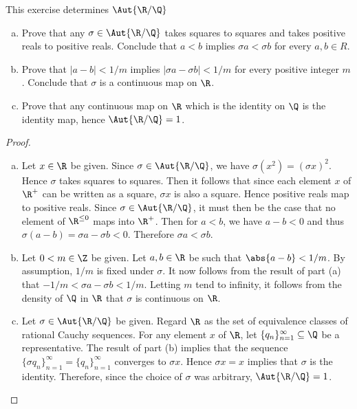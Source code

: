 \documentclass[10pt]{amsart}
\begin{document}
\begin{thm}
  \label{Ex3}
  This exercise determines $\Aut{\R/\Q}$
  \begin{enumerate}[(a)]
    \item
      Prove that any $\sigma \in \Aut{\R/\Q}$ takes squares to squares and takes positive reals to positive reals.
      Conclude that $a < b$ implies $\sigma a < \sigma b$ for every $a,b \in R$.
    \item
      Prove that $|a - b| < 1/m$ implies $|\sigma a - \sigma b|< 1/m$ for every positive integer $m$. 
      Conclude that $\sigma$ is a continuous map on $\R$.
    \item
      Prove that any continuous map on $\R$ which is the identity on $\Q$ is the identity map, hence $\Aut{\R/\Q} = 1$.
  \end{enumerate}

  \begin{proof}
    \begin{enumerate}[(a)]
    \item
      Let $x \in \R$ be given.
      Since $\sigma \in \Aut{\R/\Q}$, we have $\sigma(x^2) = (\sigma x)^2$.
      Hence $\sigma$ takes squares to squares.
      Then it follows that since each element $x$ of $\R^+$ can be written as a square, $\sigma x$ is also a square.
      Hence positive reals map to positive reals.
      Since $\sigma \in \Aut{\R/\Q}$, it must then be the case that no element of $\R^{\leq 0}$ maps into $\R^+$. 
      Then for $a < b$, we have $a - b < 0$ and thus $\sigma (a - b) = \sigma a - \sigma b < 0$.
      Therefore $\sigma a < \sigma b$.
    \item
      Let $0 < m \in \Z$ be given.
      Let $a,b \in \R$ be such that $\abs{a-b} < 1/m$.
      By assumption, $1/m$ is fixed under $\sigma$.
      It now follows from the result of part (a) that $-1/m < \sigma a - \sigma b < 1/m$.
      Letting $m$ tend to infinity, it follows from the density of $\Q$ in $\R$ that $\sigma$ is continuous on $\R$.
    \item
      Let $\sigma \in \Aut{\R/\Q}$ be given.
      Regard $\R$ as the set of equivalence classes of rational Cauchy sequences.
      For any element $x$ of $\R$, let $\{q_n\}_{n=1}^{\infty} \subseteq \Q$ be a representative.
      The result of part (b) implies that the sequence $\{\sigma q_n\}_{n=1}^{\infty} = \{q_n\}_{n=1}^{\infty}$ converges to $\sigma x$.
      Hence $\sigma x = x$ implies that $\sigma$ is the identity.
      Therefore, since the choice of $\sigma$ was arbitrary, $\Aut{\R/\Q} = 1$.
    \end{enumerate}
  \end{proof}
\end{thm}
\end{document}
